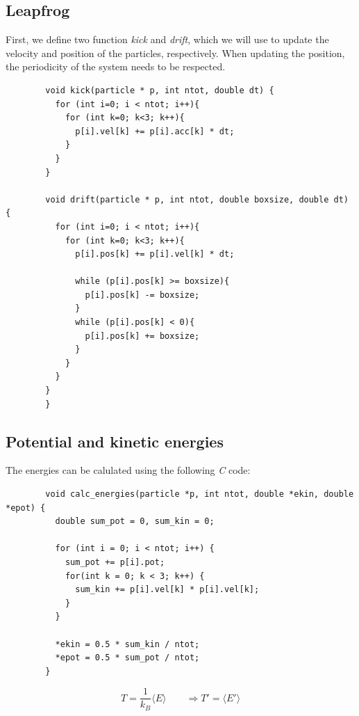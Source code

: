 \subsection{Leapfrog}
    First, we define two function \textit{kick}  and \textit{drift}, which
    we will use to update the velocity and position of the particles, 
    respectively. When updating the position, the periodicity of the system 
    needs to be respected. \\
    \begin{lstlisting}
        void kick(particle * p, int ntot, double dt) {
          for (int i=0; i < ntot; i++){
            for (int k=0; k<3; k++){
              p[i].vel[k] += p[i].acc[k] * dt;
            }
          }
        }
        
        void drift(particle * p, int ntot, double boxsize, double dt) {
          for (int i=0; i < ntot; i++){
            for (int k=0; k<3; k++){
              p[i].pos[k] += p[i].vel[k] * dt;
        
              while (p[i].pos[k] >= boxsize){
                p[i].pos[k] -= boxsize;
              }
              while (p[i].pos[k] < 0){
                p[i].pos[k] += boxsize;
              }
            }
          }
        }
        }\end{lstlisting}

\newpage
\subsection{Potential and kinetic energies}
    The energies can be calulated using the following \textit{C} code: \\
    \begin{lstlisting}
        void calc_energies(particle *p, int ntot, double *ekin, double *epot) {
          double sum_pot = 0, sum_kin = 0;
        
          for (int i = 0; i < ntot; i++) {
            sum_pot += p[i].pot;
            for(int k = 0; k < 3; k++) {
              sum_kin += p[i].vel[k] * p[i].vel[k];
            }
          }
        
          *ekin = 0.5 * sum_kin / ntot;
          *epot = 0.5 * sum_pot / ntot;
        }\end{lstlisting}

    \begin{equation}
    	T=\frac{1}{k_B}\langle E\rangle \qquad
        \Rightarrow T'=\langle E'\rangle
    \end{equation}

